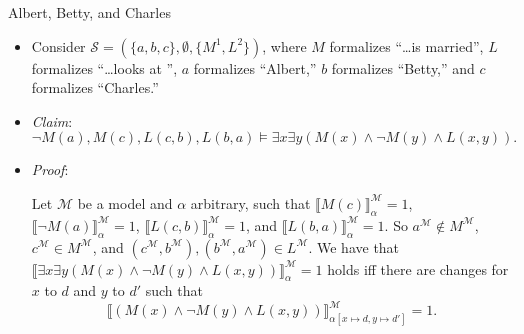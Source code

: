 \begin{frame}{Albert, Betty, and Charles}

	\begin{itemize}%
	\itemsep=16pt
		
		\item Consider $\mathcal{S}=(\{a,b,c\}, \emptyset, \{M^1, L^2\})$, where $M$ formalizes ``\dots is married'', $L$ formalizes ``\dots looks at \underline{\phantom{\dots}}'', $a$ formalizes ``Albert,'' $b$ formalizes ``Betty,'' and $c$ formalizes ``Charles.''
		
		\item \emph{Claim}: \[\neg M(a), M(c), L(c,b), L(b,a)\vDash \exists x\exists y(M(x)\land \neg M(y)\land L(x,y)).\]
		
		\item \emph{Proof}: 	
		
		Let $\mathcal{M}$ be a model and $\alpha$ arbitrary, such that $\llbracket M(c)\rrbracket_\alpha^\mathcal{M}=1$, $\llbracket\neg M(a)\rrbracket_\alpha^\mathcal{M}=1$, $\llbracket L(c,b)\rrbracket_\alpha^\mathcal{M}=1$, and $\llbracket L(b,a)\rrbracket_\alpha^\mathcal{M}=1$. So $a^\mathcal{M}\notin M^\mathcal{M}$, $c^\mathcal{M}\in M^\mathcal{M}$, and $( c^\mathcal{M}, b^\mathcal{M}), ( b^\mathcal{M}, a^\mathcal{M})\in L^\mathcal{M}$. We have that $\llbracket \exists x\exists y(M(x)\land \neg M(y)\land L(x,y))\rrbracket_\alpha^\mathcal{M}=1$ holds iff there are changes for $x$ to $d$ and $y$ to $d'$ such that \[\llbracket (M(x)\land \neg M(y)\land L(x,y))\rrbracket_{\alpha[x\mapsto d, y\mapsto d']}^\mathcal{M}=1.\] 
	\end{itemize}

\end{frame}

